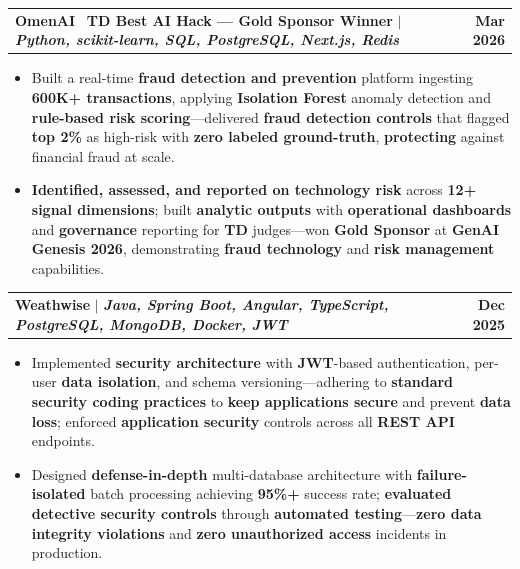 \documentclass[letterpaper,10pt]{article}
\makeatletter
\newcommand{\resumeItem}[1]{
  \item\small{
    {#1 \vspace{-1pt}}
  }
}
\newcommand{\resumeProjectHeading}[2]{
    \item
    \begin{tabular*}{1.001\textwidth}{l@{\extracolsep{\fill}}r}
      \small#1 & \textbf{\small #2}\\
    \end{tabular*}\vspace{-9pt}
}
\newcommand{\resumeItemListStart}{\begin{itemize}[leftmargin=0.15in]}
\newcommand{\resumeItemListEnd}{\end{itemize}\vspace{-4pt}}
\makeatother
\begin{document}
    \resumeProjectHeading
          {\textbf{OmenAI} \textbar\ \textbf{TD Best AI Hack --- Gold Sponsor Winner} $|$ \emph{\textbf{Python, scikit-learn, SQL, PostgreSQL, Next.js, Redis}}}{Mar 2026}
    \resumeItemListStart
    \resumeItem{Built a real-time \textbf{fraud detection and prevention} platform ingesting \textbf{600K+ transactions}, applying \textbf{Isolation Forest} anomaly detection and \textbf{rule-based risk scoring}---delivered \textbf{fraud detection controls} that flagged \textbf{top 2\%} as high-risk with \textbf{zero labeled ground-truth}, \textbf{protecting} against financial fraud at scale.}
    \vspace{-2pt}
    \resumeItem{\textbf{Identified, assessed, and reported on technology risk} across \textbf{12+ signal dimensions}; built \textbf{analytic outputs} with \textbf{operational dashboards} and \textbf{governance} reporting for \textbf{TD} judges---won \textbf{Gold Sponsor} at \textbf{GenAI Genesis 2026}, demonstrating \textbf{fraud technology} and \textbf{risk management} capabilities.}
          \resumeItemListEnd 
          \vspace{-18pt}

      \resumeProjectHeading
          {\textbf{Weathwise} $|$ \emph{\textbf{Java, Spring Boot, Angular, TypeScript, PostgreSQL, MongoDB, Docker, JWT}}}{Dec 2025}
          \resumeItemListStart
            \resumeItem{Implemented \textbf{security architecture} with \textbf{JWT}-based authentication, per-user \textbf{data isolation}, and schema versioning---adhering to \textbf{standard security coding practices} to \textbf{keep applications secure} and prevent \textbf{data loss}; enforced \textbf{application security} controls across all \textbf{REST API} endpoints.}
            \vspace{-2pt}
            \resumeItem{Designed \textbf{defense-in-depth} multi-database architecture with \textbf{failure-isolated} batch processing achieving \textbf{95\%+} success rate; \textbf{evaluated detective security controls} through \textbf{automated testing}---\textbf{zero data integrity violations} and \textbf{zero unauthorized access} incidents in production.}
          \resumeItemListEnd
          \vspace{-18pt}
\end{document}

